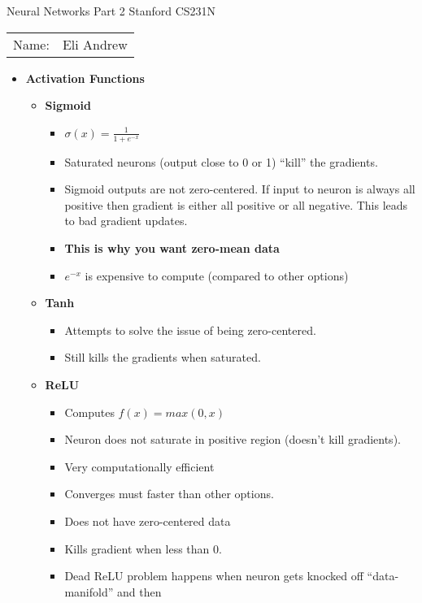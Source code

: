 \documentclass[12pt]{article}
\begin{document}
\begin{center}
{\Large Neural Networks Part 2 Stanford CS231N}

\begin{tabular}{rl}
Name: & Eli Andrew
\end{tabular}
\end{center}

  \begin{itemize}
    \item \textbf{Activation Functions}
    \begin{itemize}
      \item \textbf{Sigmoid}
      \begin{itemize}
        \item $\sigma(x) = \frac{1}{1 + e^{-x}}$
        \item Saturated neurons (output close to 0 or 1) ``kill'' the gradients.
        \item Sigmoid outputs are not zero-centered. If input to neuron is always all positive
        then gradient is either all positive or all negative. This leads to bad gradient updates.
        \item \textbf{This is why you want zero-mean data}
        \item $e^{-x}$ is expensive to compute (compared to other options)
      \end{itemize}
      \item \textbf{Tanh}
      \begin{itemize}
        \item Attempts to solve the issue of being zero-centered.
        \item Still kills the gradients when saturated.
      \end{itemize}
      \item \textbf{ReLU}
      \begin{itemize}
        \item Computes $f(x) = max(0, x)$
        \item Neuron does not saturate in positive region (doesn't kill gradients).
        \item Very computationally efficient
        \item Converges must faster than other options.
        \item Does not have zero-centered data
        \item Kills gradient when less than 0.
        \item Dead ReLU problem happens when neuron gets knocked off ``data-manifold'' and then

\end{itemize}
\end{itemize}
\end{itemize}
\end{document}
